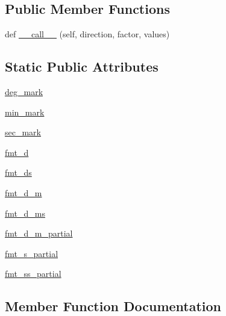 \subsection*{Public Member Functions}
\begin{DoxyCompactItemize}
\item 
def \hyperlink{classaxisartist_1_1angle__helper_1_1FormatterHMS_acca1cd92620a92fc512951f69a40b761}{\+\_\+\+\_\+call\+\_\+\+\_\+} (self, direction, factor, values)
\end{DoxyCompactItemize}
\subsection*{Static Public Attributes}
\begin{DoxyCompactItemize}
\item 
\hyperlink{classaxisartist_1_1angle__helper_1_1FormatterHMS_aae998fdedd6ba5df8db2ab13add3b9f9}{deg\+\_\+mark}
\item 
\hyperlink{classaxisartist_1_1angle__helper_1_1FormatterHMS_ae6664184b1f9be2331d1de4a73c42f3c}{min\+\_\+mark}
\item 
\hyperlink{classaxisartist_1_1angle__helper_1_1FormatterHMS_a61d7f6aeff1aeabc800d49cca4cc7cda}{sec\+\_\+mark}
\item 
\hyperlink{classaxisartist_1_1angle__helper_1_1FormatterHMS_ac9df2bd8ca757e1749aa63c99cace10a}{fmt\+\_\+d}
\item 
\hyperlink{classaxisartist_1_1angle__helper_1_1FormatterHMS_a871f0c209127493b239432c19a78bafa}{fmt\+\_\+ds}
\item 
\hyperlink{classaxisartist_1_1angle__helper_1_1FormatterHMS_a0858add754be0a6a71022761094d129b}{fmt\+\_\+d\+\_\+m}
\item 
\hyperlink{classaxisartist_1_1angle__helper_1_1FormatterHMS_aff4d3c9249e990f9442fbcc84db50e24}{fmt\+\_\+d\+\_\+ms}
\item 
\hyperlink{classaxisartist_1_1angle__helper_1_1FormatterHMS_a313e138ac446934932da7f984bbf53b1}{fmt\+\_\+d\+\_\+m\+\_\+partial}
\item 
\hyperlink{classaxisartist_1_1angle__helper_1_1FormatterHMS_ab39d49fb73411cd77a9708d15d05d410}{fmt\+\_\+s\+\_\+partial}
\item 
\hyperlink{classaxisartist_1_1angle__helper_1_1FormatterHMS_a8c99a26a39a7049b1f2d06b33cce8399}{fmt\+\_\+ss\+\_\+partial}
\end{DoxyCompactItemize}


\subsection{Member Function Documentation}
\mbox{\label{classaxisartist_1_1angle__helper_1_1FormatterHMS_acca1cd92620a92fc512951f69a40b761}} 

